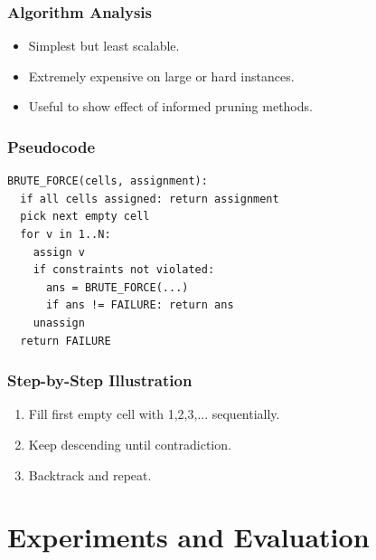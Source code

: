 \documentclass[12pt,a4paper]{article}
\begin{document}
\subsubsection{Algorithm Analysis}
\begin{itemize}
    \item Simplest but least scalable.
    \item Extremely expensive on large or hard instances.
    \item Useful to show effect of informed pruning methods.
\end{itemize}

\subsubsection{Pseudocode}
\begin{lstlisting}[style=pseudostyle, caption={Brute-Force Baseline}]
BRUTE_FORCE(cells, assignment):
  if all cells assigned: return assignment
  pick next empty cell
  for v in 1..N:
    assign v
    if constraints not violated:
      ans = BRUTE_FORCE(...)
      if ans != FAILURE: return ans
    unassign
  return FAILURE
\end{lstlisting}

\subsubsection{Step-by-Step Illustration}
\begin{enumerate}
    \item Fill first empty cell with 1,2,3,... sequentially.
    \item Keep descending until contradiction.
    \item Backtrack and repeat.
\end{enumerate}

\section{Experiments and Evaluation}
\end{document}
